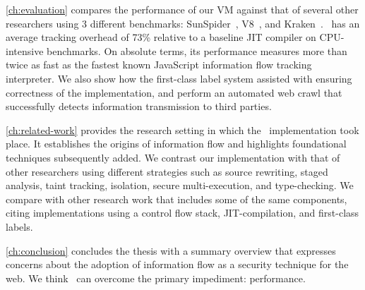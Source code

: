 \autoref{ch:evaluation} compares the performance of our VM against that of several other researchers using 3 different benchmarks: SunSpider~\cite{sunspider}, V8~\cite{v8}, and Kraken~\cite{kraken}.
\JitFlow\ has an average tracking overhead of 73\% relative to a baseline JIT compiler on CPU-intensive benchmarks.
On absolute terms, its performance measures more than twice as fast as the fastest known JavaScript information flow tracking interpreter.
We also show how the first-class label system assisted with ensuring correctness of the implementation, and perform an automated web crawl that successfully detects information transmission to third parties.

\autoref{ch:related-work} provides the research setting in which the \JitFlow\ implementation took place.
It establishes the origins of information flow and highlights foundational techniques subsequently added.
We contrast our implementation with that of other researchers using different strategies such as source rewriting, staged analysis, taint tracking, isolation, secure multi-execution, and type-checking.
We compare with other research work that includes some of the same components, citing implementations using a control flow stack, JIT-compilation, and first-class labels.

\autoref{ch:conclusion} concludes the thesis with a summary overview that expresses concerns about the adoption of information flow as a security technique for the web.
We think \JitFlow\ can overcome the primary impediment: performance.



